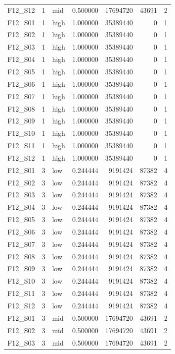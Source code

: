 \begin{longtable}{lllr r r r}
F12\_S12 & 1 & mid & 0.500000 & 17694720 & 43691 & 2 \\
F12\_S01 & 1 & high & 1.000000 & 35389440 & 0 & 1 \\
F12\_S02 & 1 & high & 1.000000 & 35389440 & 0 & 1 \\
F12\_S03 & 1 & high & 1.000000 & 35389440 & 0 & 1 \\
F12\_S04 & 1 & high & 1.000000 & 35389440 & 0 & 1 \\
F12\_S05 & 1 & high & 1.000000 & 35389440 & 0 & 1 \\
F12\_S06 & 1 & high & 1.000000 & 35389440 & 0 & 1 \\
F12\_S07 & 1 & high & 1.000000 & 35389440 & 0 & 1 \\
F12\_S08 & 1 & high & 1.000000 & 35389440 & 0 & 1 \\
F12\_S09 & 1 & high & 1.000000 & 35389440 & 0 & 1 \\
F12\_S10 & 1 & high & 1.000000 & 35389440 & 0 & 1 \\
F12\_S11 & 1 & high & 1.000000 & 35389440 & 0 & 1 \\
F12\_S12 & 1 & high & 1.000000 & 35389440 & 0 & 1 \\
F12\_S01 & 3 & low & 0.244444 & 9191424 & 87382 & 4 \\
F12\_S02 & 3 & low & 0.244444 & 9191424 & 87382 & 4 \\
F12\_S03 & 3 & low & 0.244444 & 9191424 & 87382 & 4 \\
F12\_S04 & 3 & low & 0.244444 & 9191424 & 87382 & 4 \\
F12\_S05 & 3 & low & 0.244444 & 9191424 & 87382 & 4 \\
F12\_S06 & 3 & low & 0.244444 & 9191424 & 87382 & 4 \\
F12\_S07 & 3 & low & 0.244444 & 9191424 & 87382 & 4 \\
F12\_S08 & 3 & low & 0.244444 & 9191424 & 87382 & 4 \\
F12\_S09 & 3 & low & 0.244444 & 9191424 & 87382 & 4 \\
F12\_S10 & 3 & low & 0.244444 & 9191424 & 87382 & 4 \\
F12\_S11 & 3 & low & 0.244444 & 9191424 & 87382 & 4 \\
F12\_S12 & 3 & low & 0.244444 & 9191424 & 87382 & 4 \\
F12\_S01 & 3 & mid & 0.500000 & 17694720 & 43691 & 2 \\
F12\_S02 & 3 & mid & 0.500000 & 17694720 & 43691 & 2 \\
F12\_S03 & 3 & mid & 0.500000 & 17694720 & 43691 & 2 \\

\end{longtable}
